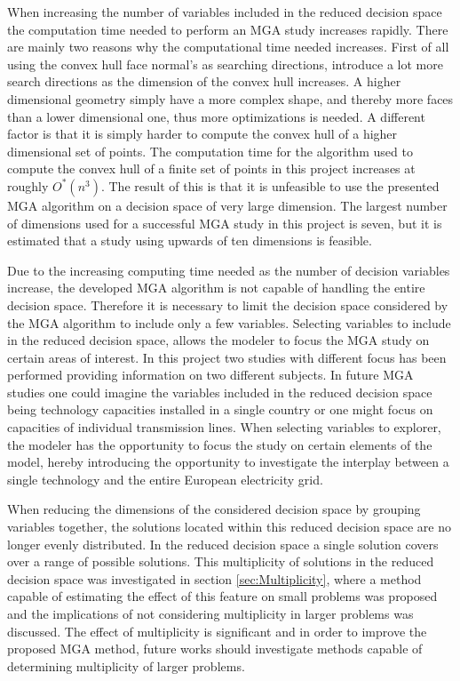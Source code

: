 When increasing the number of variables included in the reduced decision space the computation time needed to perform an MGA study increases rapidly. There are mainly two reasons why the computational time needed increases. First of all using the convex hull face normal's as searching directions, introduce a lot more search directions as the dimension of the convex hull increases. A higher dimensional geometry simply have a more complex shape, and thereby more faces than a lower dimensional one, thus more optimizations is needed. A different factor is that it is simply harder to compute the convex hull of a higher dimensional set of points. The computation time for the algorithm used to compute the convex hull of a finite set of points in this project \cite{qhull} increases at roughly $O^*(n^3)$. The result of this is that it is unfeasible to use the presented MGA algorithm on a decision space of very large dimension. The largest number of dimensions used for a successful MGA study in this project is seven, but it is estimated that a study using upwards of ten dimensions is feasible. 

Due to the increasing computing time needed as the number of decision variables increase, the developed MGA algorithm is not capable of handling the entire decision space. Therefore it is necessary to limit the decision space considered by the MGA algorithm to include only a few variables. Selecting variables to include in the reduced decision space, allows the modeler to focus the MGA study on certain areas of interest. In this project two studies with different focus has been performed providing information on two different subjects. In future MGA studies one could imagine the variables included in the reduced decision space being technology capacities installed in a single country or one might focus on capacities of individual transmission lines. When selecting variables to explorer, the modeler has the opportunity to focus the study on certain elements of the model, hereby introducing the opportunity to investigate the interplay between a single technology and the entire European electricity grid.  

When reducing the dimensions of the considered decision space by grouping variables together, the solutions located within this reduced decision space are no longer evenly distributed. In the reduced decision space a single solution covers over a range of possible solutions. This multiplicity of solutions in the reduced decision space was investigated in section \ref{sec:Multiplicity}, where a method capable of estimating the effect of this feature on small problems was proposed and the implications of not considering multiplicity in larger problems was discussed. The effect of multiplicity is significant and in order to improve the proposed MGA method, future works should investigate methods capable of determining multiplicity of larger problems. 

